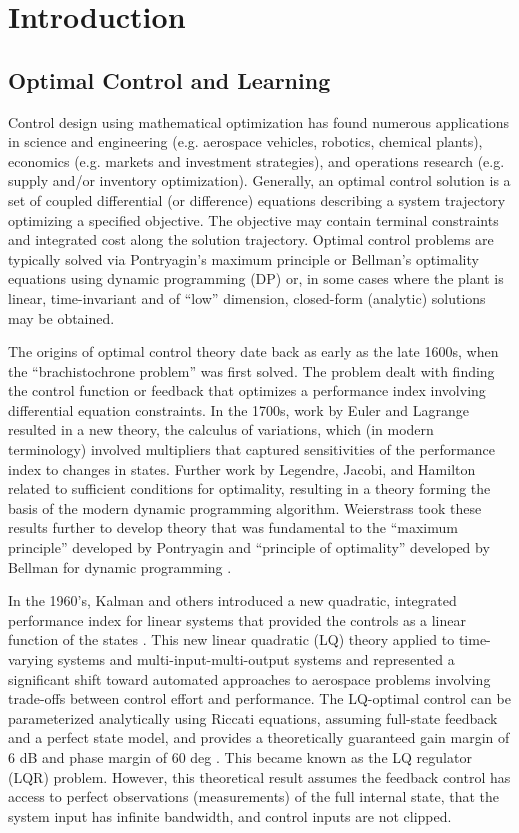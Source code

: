 \chapter{Introduction}
\label{chap:intro}

\section{Optimal Control and Learning}
\label{chap:introOptimalControlLearning}
Control design using mathematical optimization has found numerous applications in science and engineering (e.g. aerospace vehicles, robotics, chemical plants), economics (e.g. markets and investment strategies), and operations research (e.g. supply and/or inventory optimization).  Generally, an optimal control solution is a set of coupled differential (or difference) equations describing a system trajectory optimizing a specified objective.  The objective may contain terminal constraints and integrated cost along the solution trajectory.  Optimal control problems are typically solved via Pontryagin's maximum principle or Bellman's optimality equations using dynamic programming (DP) \cite{stengel,kirk} or, in some cases where the plant is linear, time-invariant and of ``low'' dimension, closed-form (analytic) solutions may be obtained.

The origins of optimal control theory date back as early as the late 1600s, when the ``brachistochrone problem'' was first solved.  The problem dealt with finding the control function or feedback that optimizes a performance index involving differential equation constraints.  In the 1700s, work by Euler and Lagrange resulted in a new theory, the calculus of variations, which (in modern terminology) involved multipliers that captured sensitivities of the performance index to changes in states.  Further work by Legendre, Jacobi, and Hamilton related to sufficient conditions for optimality, resulting in a theory forming the basis of the modern dynamic programming algorithm.  Weierstrass took these results further to develop theory that was fundamental to the ``maximum principle'' developed by Pontryagin and ``principle of optimality'' developed by Bellman for dynamic programming \cite{bryson1996optimal}.

In the 1960's, Kalman and others introduced a new quadratic, integrated performance index for linear systems that provided the controls as a linear function of the states \cite{kalman1960contributions}.  This new linear quadratic (LQ) theory applied to time-varying systems and multi-input-multi-output systems and represented a significant shift toward automated approaches to aerospace problems involving trade-offs between control effort and performance.  The LQ-optimal control can be parameterized analytically using Riccati equations, assuming full-state feedback and a perfect state model, and provides a theoretically guaranteed gain margin of 6 dB and phase margin of 60 deg \cite{safonov1977gain}.  This became known as the LQ regulator (LQR) problem.  However, this theoretical result assumes the feedback control has access to perfect observations (measurements) of the full internal state, that the system input has infinite bandwidth, and control inputs are not clipped.

